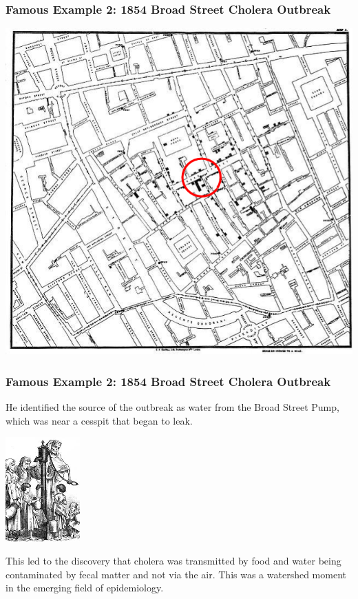 \documentclass[handout]{beamer}
\newcommand{\blue}[1]{\textcolor{blue2}{#1}}
\begin{document}
\begin{frame}
\frametitle{Famous Example 2:  1854 Broad Street Cholera Outbreak}

\begin{center}
\includegraphics[height=0.8\textheight]{figure/cholera2.png}
\end{center}

\end{frame}


\begin{frame}
\frametitle{Famous Example 2:  1854 Broad Street Cholera Outbreak}

He identified the source of the outbreak as water from the \blue{Broad Street Pump}, which was near a cesspit that began to leak. 

\begin{center}
\includegraphics[height=4cm]{figure/king_cholera.jpg}
\end{center}

\pause This led to the discovery that cholera was transmitted by food and water being contaminated by fecal matter and not via the air.  This was a watershed moment in the emerging field of \blue{epidemiology}.  

\end{frame}
\end{document}
